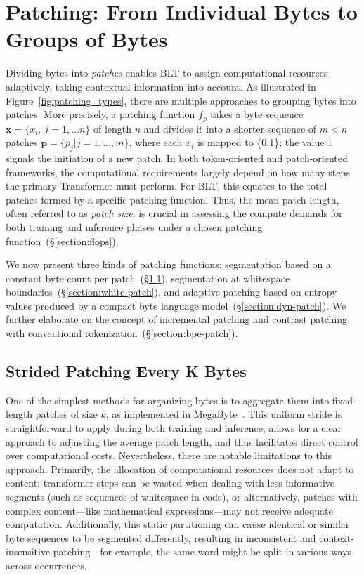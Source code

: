 \section{Patching: From Individual Bytes to Groups of Bytes}
\label{section:patching}

Dividing bytes into \textit{patches} enables {\textsc BLT} to assign computational resources adaptively, taking contextual information into account. As illustrated in Figure~\ref{fig:patching_types}, there are multiple approaches to grouping bytes into patches. More precisely, a patching function $f_p$ takes a byte sequence $\pmb{x}=\{x_i,|i=1,\ldots n\}$ of length $n$ and divides it into a shorter sequence of $m < n$ patches $\pmb{p}=\{p_j|j=1,\ldots,m\}$, where each $x_i$ is mapped to \{0,1\}; the value 1 signals the initiation of a new patch. In both token-oriented and patch-oriented frameworks, the computational requirements largely depend on how many steps the primary Transformer must perform. For {\textsc BLT}, this equates to the total patches formed by a specific patching function. Thus, the mean patch length, often referred to as \textit{patch size}, is crucial in assessing the compute demands for both training and inference phases under a chosen patching function~(\S\ref{section:flops}). 

We now present three kinds of patching functions: segmentation based on a constant byte count per patch~(\S\ref{section:static-patch}), segmentation at whitespace boundaries~(\S\ref{section:white-patch}), and adaptive patching based on entropy values produced by a compact byte language model~(\S\ref{section:dyn-patch}). We further elaborate on the concept of incremental patching and contrast patching with conventional tokenization~(\S\ref{section:bpe-patch}).

\subsection{Strided Patching Every K Bytes}
\label{section:static-patch}

One of the simplest methods for organizing bytes is to aggregate them into fixed-length patches of size $k$, as implemented in MegaByte~\citep{yu2023megabyte}. This uniform stride is straightforward to apply during both training and inference, allows for a clear approach to adjusting the average patch length, and thus facilitates direct control over computational costs. Nevertheless, there are notable limitations to this approach. Primarily, the allocation of computational resources does not adapt to content: transformer steps can be wasted when dealing with less informative segments (such as sequences of whitespace in code), or alternatively, patches with complex content—like mathematical expressions—may not receive adequate computation. Additionally, this static partitioning can cause identical or similar byte sequences to be segmented differently, resulting in inconsistent and context-insensitive patching—for example, the same word might be split in various ways across occurrences.

